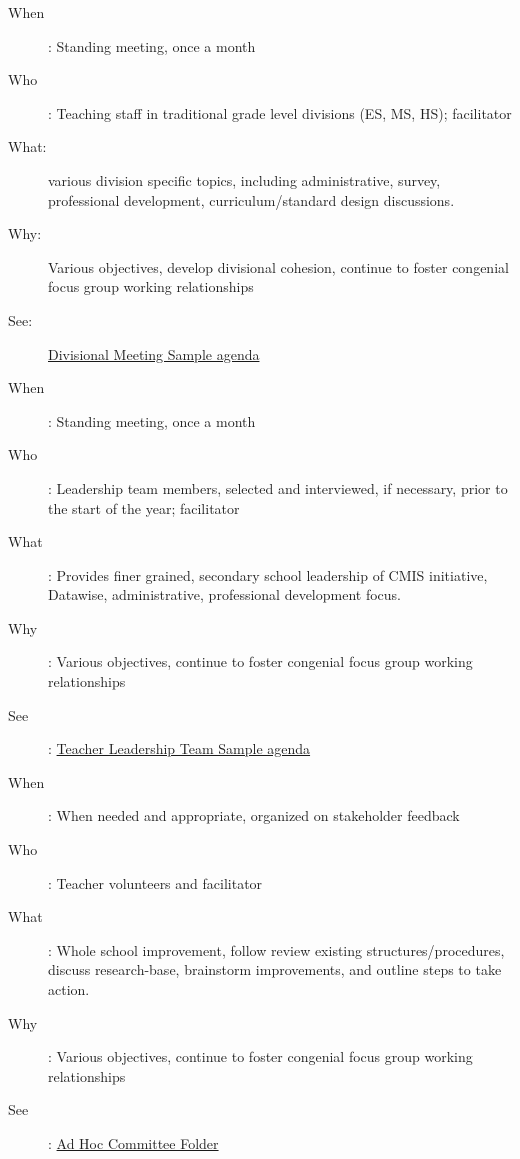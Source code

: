 \begin{findings}
\begin{description}
\item [When]: Standing meeting, once a month 
\item [Who]: Teaching staff in traditional grade level divisions (ES, MS, HS); facilitator 
\item [What:] various division specific topics, including administrative, survey, professional development, curriculum/standard design discussions. 
\item [Why:] Various objectives, develop divisional cohesion, continue to foster congenial focus group working relationships
\item [See:] \href{https://docs.google.com/a/cmis.ac.th/document/d/1xT0xZBYBEuu4zlg_DwGHZVET8WsdoTLphRXPJUNN6_o/edit?usp=sharing}{Divisional Meeting Sample agenda} 
\end{description}



\begin{description}
\item [When]: Standing meeting, once a month
\item [Who]: Leadership team members, selected and interviewed, if necessary, prior to the start of the year; facilitator 
\item [What]: Provides finer grained, secondary school leadership of CMIS initiative, Datawise, administrative, professional development focus. 
\item [Why]: Various objectives, continue to foster congenial focus group working relationships
\item [See]: \href{https://docs.google.com/a/cmis.ac.th/document/d/1M88mpMIEkx65JUSplvQMWfN6l8ur3fwpKrgzN97Hq8g/edit?usp=sharing}{Teacher Leadership Team Sample agenda} 
\end{description}


\begin{description}
\item [When]: When needed and appropriate, organized on stakeholder feedback
\item [Who]: Teacher volunteers and facilitator
\item [What]: Whole school improvement, follow review existing structures/procedures, discuss research-base, brainstorm improvements, and outline steps to take action. 
\item [Why]: Various objectives, continue to foster congenial focus group working relationships
\item [See]: \href{https://drive.google.com/drive/folders/0ByVFfrm0zfolfjVOamtmQjRQSkRwV0cyX3prVnJaV3g4cHFkS1c5dkEtZE1idS12ZWpRcXc?usp=sharing}{Ad Hoc Committee Folder}
\end{description}



\end{findings}
